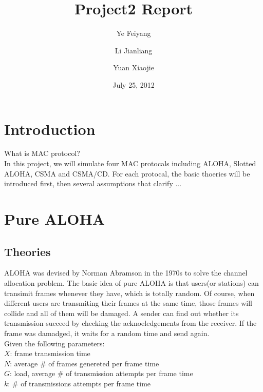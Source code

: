 \documentclass[11pt,oneside,a4paper]{report}
\begin{document}
\title{Project2 Report}

\author{Ye Feiyang \and Li Jianliang \and Yuan Xiaojie}

\date{July 25, 2012}

\maketitle

\section*{Introduction}

What is MAC protocol?\\
In this project, we will simulate four MAC protocals including ALOHA, Slotted ALOHA, CSMA and CSMA/CD. For each protocal, the basic thoeries will be introduced first, then several assumptions that clarify ...

\section*{Pure ALOHA}

\subsection*{Theories}

ALOHA was devised by Norman Abramson in the 1970s to solve the channel allocation problem. The basic idea of pure ALOHA is that users(or stations) can transimit frames whenever they have, which is totally random. Of course, when different users are transmiting their frames at the same time, those frames will collide and all of them will be damaged. A sender can find out whether its transmission succeed by checking the acknoeledgements from the receiver. If the frame was damadged, it waits for a random time and send again. \\

Given the following parameters: \\

\qquad	\(X\): frame transmission time \\

\qquad	\(N\): average \# of frames genereted per frame time \\

\qquad	\(G\): load, average \# of transmission attempts per frame time \\

\qquad	\(k\): \# of transmissions attempts per frame time \\
\end{document}
